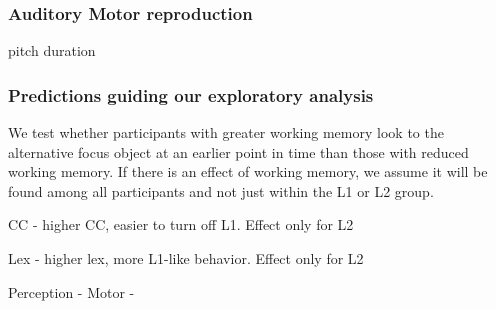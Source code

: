 \subsubsection{Auditory Motor reproduction}
pitch
duration



\subsubsection{Predictions guiding our exploratory analysis} 
We test whether participants with greater working memory look to the alternative focus object at an earlier point in time than those with reduced working memory. If there is an effect of working memory, we assume it will be found among all participants and not just within the L1 or L2 group. 



CC - higher CC, easier to turn off L1. Effect only for L2

Lex - higher lex, more L1-like behavior. Effect only for L2

Perception - 
Motor - 